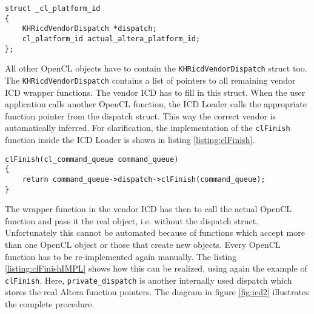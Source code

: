 \begin{lstlisting}[label=listing:structplatform, caption=Definition of \texttt{struct \_cl\_platform\_id} in the Altera ICD, morekeywords={}]
struct _cl_platform_id
{
    KHRicdVendorDispatch *dispatch;
    cl_platform_id actual_altera_platform_id;
};
\end{lstlisting}




All other OpenCL objects have to contain the \texttt{KHRicdVendorDispatch} struct too.
The \texttt{KHRicdVendorDispatch} contains a list of pointers to all remaining vendor ICD wrapper functions.
The vendor ICD has to fill in this struct.
When the user application calls another OpenCL function, the ICD Loader calls the appropriate function pointer from the dispatch struct.
This way the correct vendor is automatically inferred.
For clarification, the implementation of the \texttt{clFinish} function inside the ICD Loader is shown in listing \ref{listing:clFinish}.
\begin{lstlisting}[label=listing:clFinish, caption=Implementation of \texttt{clFinish} in the ICD Loader \cite{icdloadersrc}, morekeywords={dispatch}]
clFinish(cl_command_queue command_queue)
{
    return command_queue->dispatch->clFinish(command_queue);
}
\end{lstlisting}

The wrapper function in the vendor ICD has then to call the actual OpenCL function and pass it the real object, i.e. without the dispatch struct.
Unfortunately this cannot be automated because of functions which accept more than one OpenCL object or those that create new objects.
Every OpenCL function has to be re-implemented again manually.
The listing \ref{listing:clFinishIMPL} shows how this can be realized, using again the example of \texttt{clFinish}.
Here, \texttt{private\_dispatch} is another internally used dispatch which stores the real Altera function pointers.
The diagram in figure \ref{fig:icd2} illustrates the complete procedure.





